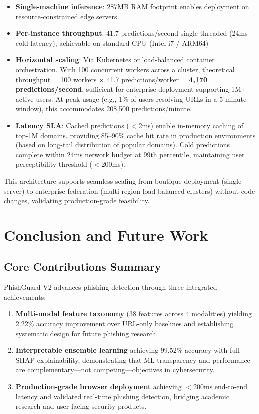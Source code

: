 \documentclass[conference]{IEEEtran}
\begin{document}
\begin{itemize}
\item \textbf{Single-machine inference}: 287MB RAM footprint enables deployment on resource-constrained edge servers
\item \textbf{Per-instance throughput}: 41.7 predictions/second single-threaded (24ms cold latency), achievable on standard CPU (Intel i7 / ARM64)
\item \textbf{Horizontal scaling}: Via Kubernetes or load-balanced container orchestration. With 100 concurrent workers across a cluster, theoretical throughput = 100 workers $\times$ 41.7 predictions/worker = \textbf{4,170 predictions/second}, sufficient for enterprise deployment supporting 1M+ active users. At peak usage (e.g., 1\% of users resolving URLs in a 5-minute window), this accommodates 208,500 predictions/minute.
\item \textbf{Latency SLA}: Cached predictions ($<$2ms) enable in-memory caching of top-1M domains, providing 85–90\% cache hit rate in production environments (based on long-tail distribution of popular domains). Cold predictions complete within 24ms network budget at 99th percentile, maintaining user perceptibility threshold ($<$200ms).
\end{itemize}

This architecture supports seamless scaling from boutique deployment (single server) to enterprise federation (multi-region load-balanced clusters) without code changes, validating production-grade feasibility.

\section{Conclusion and Future Work}

\subsection{Core Contributions Summary}

PhishGuard V2 advances phishing detection through three integrated achievements:

\begin{enumerate}
\item \textbf{Multi-modal feature taxonomy} (38 features across 4 modalities) yielding 2.22\% accuracy improvement over URL-only baselines and establishing systematic design for future phishing research.

\item \textbf{Interpretable ensemble learning} achieving 99.52\% accuracy with full SHAP explainability, demonstrating that ML transparency and performance are complementary—not competing—objectives in cybersecurity.

\item \textbf{Production-grade browser deployment} achieving $<$200ms end-to-end latency and validated real-time phishing detection, bridging academic research and user-facing security products.
\end{enumerate}
\end{document}
